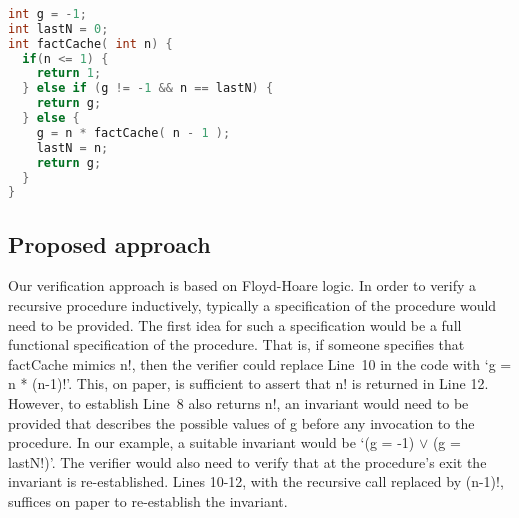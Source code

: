 \begin{lstlisting}[float,language=c,basicstyle=\scriptsize,caption= {Procedure `factCache' :
      returns n! and memoizes result for last argument seen.},
    label=lst:factorialSimple]
  
int g = -1;
int lastN = 0;
int factCache( int n) {
  if(n <= 1) {
    return 1;
  } else if (g != -1 && n == lastN) {
    return g;
  } else {
    g = n * factCache( n - 1 );
    lastN = n;
    return g;
  }
}
\end{lstlisting}

\subsection{Proposed approach}
%
%
%
Our verification approach is based on Floyd-Hoare logic. In order to verify a recursive procedure
inductively, typically a specification of the procedure would need to be
provided. The first idea for such a specification would be a full
functional specification of the procedure. That is, if someone specifies
that factCache mimics n!, then the verifier could replace Line~10 in the
code with `g = n * (n-1)!'. This, on paper, is sufficient to assert that n!
is returned in Line 12. However, to establish Line~8 also returns n!, an
invariant would need to be provided that describes the possible values of g
before any invocation to the procedure. In our example, a suitable
invariant would be `(g = -1) $\vee$ (g = lastN!)'. The verifier would also
need to verify that at the procedure's exit the invariant is
re-established. Lines 10-12, with the recursive call replaced by (n-1)!,
suffices on paper  to re-establish the invariant.

